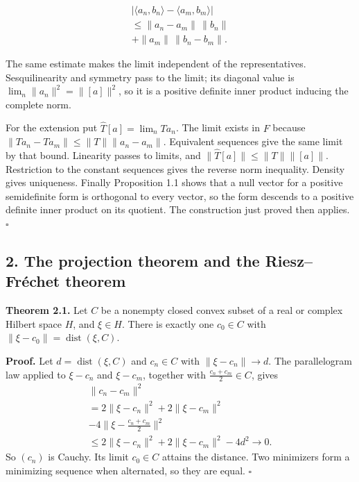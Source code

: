 \documentclass[
  english,
  11pt,
  a4paper,
]{article}
\newcounter{none} %
\begin{document}
\[\begin{gathered}
|\langle a_n,b_n\rangle-\langle a_m,b_m\rangle|\\
\leq\|a_n-a_m\|\,\|b_n\|\\
+\|a_m\|\,\|b_n-b_m\|.
\end{gathered}\]

The same estimate makes the limit independent of the representatives.
Sesquilinearity and symmetry pass to the limit; its diagonal value is
\(\lim_n\|a_n\|^2=\|[a]\|^2\), so it is a positive definite inner
product inducing the complete norm.

For the extension put \(\widehat T[a]=\lim_nTa_n\). The limit exists in
\(F\) because \(\|Ta_n-Ta_m\|\leq\|T\|\|a_n-a_m\|\). Equivalent
sequences give the same limit by that bound. Linearity passes to limits,
and \(\|\widehat T[a]\|\leq\|T\|\|[a]\|\). Restriction to the constant
sequences gives the reverse norm inequality. Density gives uniqueness.
Finally Proposition 1.1 shows that a null vector for a positive
semidefinite form is orthogonal to every vector, so the form descends to
a positive definite inner product on its quotient. The construction just
proved then applies. \(\square\)

\subsection[2. The projection theorem and the Riesz--Fréchet
theorem]{\texorpdfstring{\protect\hypertarget{hilbert-spaces-and-compact-operators--oa-fnd-hs-02}{}{}2.
The projection theorem and the Riesz--Fréchet
theorem}{2. The projection theorem and the Riesz--Fréchet theorem}}\label{hilbert-spaces-and-compact-operators--OA-FND-HS-02}

\textbf{Theorem 2.1.} Let \(C\) be a nonempty closed convex subset of a
real or complex Hilbert space \(H\), and \(\xi\in H\). There is exactly
one \(c_0\in C\) with \(\|\xi-c_0\|=\operatorname{dist}(\xi,C)\).

\textbf{Proof.} Let \(d=\operatorname{dist}(\xi,C)\) and \(c_n\in C\)
with \(\|\xi-c_n\|\to d\). The parallelogram law applied to \(\xi-c_n\)
and \(\xi-c_m\), together with \(\frac{c_n+c_m}2\in C\), gives
\[\begin{gathered}
\|c_n-c_m\|^2\\
=2\|\xi-c_n\|^2+2\|\xi-c_m\|^2\\
-4\Big\|\xi-\frac{c_n+c_m}2\Big\|^2\\
\le2\|\xi-c_n\|^2+2\|\xi-c_m\|^2-4d^2\to0.
\end{gathered}\] So \((c_n)\) is Cauchy. Its limit \(c_0\in C\) attains
the distance. Two minimizers form a minimizing sequence when alternated,
so they are equal. \(\square\)
\end{document}
